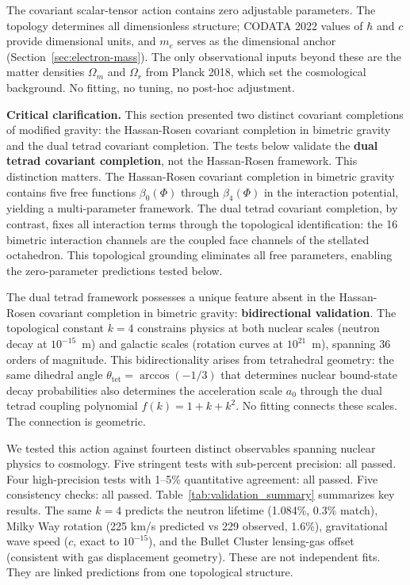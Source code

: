 \documentclass[aps,prd,preprint,superscriptaddress,showpacs,preprintnumbers,amsmath,amssymb,nofootinbib]{revtex4-2}
\begin{document}
The covariant scalar-tensor action contains zero adjustable parameters. The topology determines all dimensionless structure; CODATA 2022 values of $\hbar$ and $c$ provide dimensional units, and $m_e$ serves as the dimensional anchor (Section~\ref{sec:electron-mass}). The only observational inputs beyond these are the matter densities $\Omega_m$ and $\Omega_r$ from Planck 2018, which set the cosmological background. No fitting, no tuning, no post-hoc adjustment.

\textbf{Critical clarification.} This section presented two distinct covariant completions of modified gravity: the Hassan-Rosen covariant completion in bimetric gravity~\cite{hassan2012} and the dual tetrad covariant completion. The tests below validate the \textbf{dual tetrad covariant completion}, not the Hassan-Rosen framework. This distinction matters. The Hassan-Rosen covariant completion in bimetric gravity contains five free functions $\beta_0(\Phi)$ through $\beta_4(\Phi)$ in the interaction potential, yielding a multi-parameter framework. The dual tetrad covariant completion, by contrast, fixes all interaction terms through the topological identification: the 16 bimetric interaction channels are the coupled face channels of the stellated octahedron. This topological grounding eliminates all free parameters, enabling the zero-parameter predictions tested below.

The dual tetrad framework possesses a unique feature absent in the Hassan-Rosen covariant completion in bimetric gravity: \textbf{bidirectional validation}. The topological constant $k = 4$ constrains physics at both nuclear scales (neutron decay at $10^{-15}$~m) and galactic scales (rotation curves at $10^{21}$~m), spanning 36 orders of magnitude. This bidirectionality arises from tetrahedral geometry: the same dihedral angle $\theta_{\text{tet}} = \arccos(-1/3)$ that determines nuclear bound-state decay probabilities also determines the acceleration scale $a_0$ through the dual tetrad coupling polynomial $f(k) = 1 + k + k^2$. No fitting connects these scales. The connection is geometric.

We tested this action against fourteen distinct observables spanning nuclear physics to cosmology. Five stringent tests with sub-percent precision: all passed. Four high-precision tests with 1--5\% quantitative agreement: all passed. Five consistency checks: all passed. Table~\ref{tab:validation_summary} summarizes key results. The same $k = 4$ predicts the neutron lifetime (1.084\%, 0.3\% match), Milky Way rotation (225 km/s predicted vs 229 observed, 1.6\%), gravitational wave speed ($c$, exact to $10^{-15}$), and the Bullet Cluster lensing-gas offset (consistent with gas displacement geometry). These are not independent fits. They are linked predictions from one topological structure.
\end{document}
